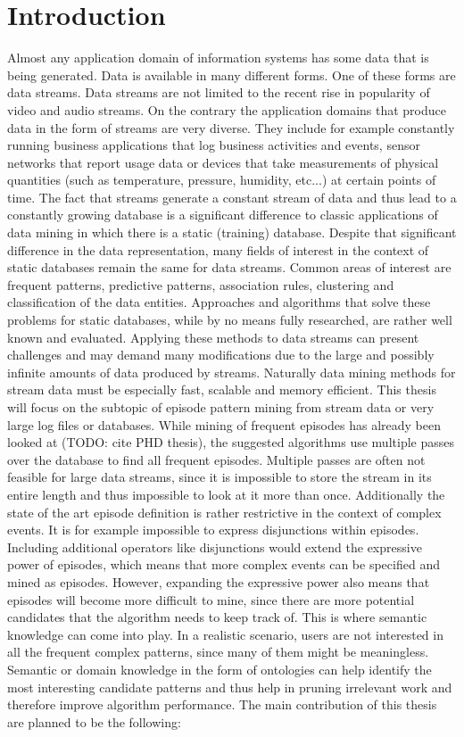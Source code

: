 \documentclass[journal]{IEEEtran}
\begin{document}
\section{Introduction}
Almost any application domain of information systems has some data that is being generated. Data is available in many different forms. One of these forms are data streams. Data streams are not limited to the recent rise in popularity of video and audio streams. On the contrary the application domains that produce data in the form of streams are very diverse. They include for example constantly running business applications that log business activities and events, sensor networks that report usage data or devices that take measurements of physical quantities (such as temperature, pressure, humidity, etc...) at certain points of time. \newline
The fact that streams generate a constant stream of data and thus lead to a constantly growing database is a significant difference to classic applications of data mining in which there is a static (training) database. Despite that significant difference in the data representation, many fields of interest in the context of static databases remain the same for data streams. Common areas of interest are frequent patterns, predictive patterns, association rules, clustering and classification of the data entities. Approaches and algorithms that solve these problems for static databases, while by no means fully researched, are rather well known and evaluated. Applying these methods to data streams can present challenges and may demand many modifications due to the large and possibly infinite amounts of data produced by streams. Naturally data mining methods for stream data must be especially fast, scalable and memory efficient. \newline
This thesis will focus on the subtopic of episode pattern mining from stream data or very large log files or databases. While mining of frequent episodes has already been looked at (TODO: cite PHD thesis), the suggested algorithms use multiple passes over the database to find all frequent episodes. Multiple passes are often not feasible for large data streams, since it is impossible to store the stream in its entire length and thus impossible to look at it more than once. Additionally the state of the art episode definition is rather restrictive in the context of complex events. It is for example impossible to express disjunctions within episodes. Including additional operators like disjunctions would extend the expressive power of episodes, which means that more complex events can be specified and mined as episodes. However, expanding the expressive power also means that episodes will become more difficult to mine, since there are more potential candidates that the algorithm needs to keep track of. This is where semantic knowledge can come into play. In a realistic scenario, users are not interested in all the frequent complex patterns, since many of them might be meaningless. Semantic or domain knowledge in the form of ontologies can help identify the most interesting candidate patterns and thus help in pruning irrelevant work and therefore improve algorithm performance.
The main contribution of this thesis are planned to be the following:
\end{document}
